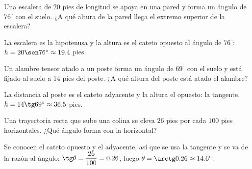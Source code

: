 \documentclass[11pt]{article}
\begin{document}
\begin{preguntas}
\pregunta Una escalera de $20$ pies de longitud se apoya en una pared y forma un ángulo de
$76^\circ$ con el suelo. ¿A qué altura de la pared llega el extremo superior de la
escalera?
\begin{solucion}[3cm]
La escalera es la hipotenusa y la altura es el cateto opuesto al ángulo de $76^\circ$:
$h = 20\sen 76^\circ \approx \num{19,4}$ pies.
\end{solucion}

\pregunta Un alambre tensor atado a un poste forma un ángulo de $69^\circ$ con el suelo y
está fijado al suelo a $14$ pies del poste. ¿A qué altura del poste está atado el alambre?
\begin{solucion}[3cm]
La distancia al poste es el cateto adyacente y la altura el opuesto: la tangente.
$h = 14\tg 69^\circ \approx \num{36,5}$ pies.
\end{solucion}

\pregunta Una trayectoria recta que sube una colina se eleva $26$ pies por cada $100$ pies
horizontales. ¿Qué ángulo forma con la horizontal?
\begin{solucion}[3cm]
Se conocen el cateto opuesto y el adyacente, así que se usa la tangente y se va de la
razón al ángulo: $\tg\theta = \dfrac{26}{100} = \num{0,26}$, luego
$\theta = \arctg \num{0,26} \approx \num{14,6}^\circ$.
\end{solucion}

\end{preguntas}
\end{document}
